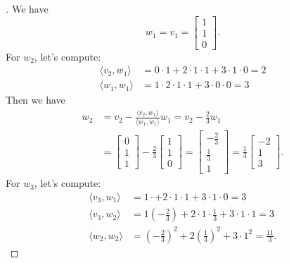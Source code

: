 \documentclass[11pt]{article}
\begin{document}
\begin{enumerate}
        \begin{proof}[\unskip\nopunct]
            We have \[w_1 = v_1 = \begin{bmatrix}
                1 \\ 1 \\ 0
            \end{bmatrix}.\] For \(w_2\), let's compute:
            \begin{align*}
                \langle v_2, w_1 \rangle &= 0 \cdot 1 + 2 \cdot 1 \cdot 1 + 3 \cdot 1 \cdot 0 = 2 \\
                \langle w_1, w_1 \rangle &= 1 \cdot 2 \cdot 1 \cdot 1 + 3 \cdot 0 \cdot 0 = 3
            \end{align*}
            Then we have
            \begin{align*}
                w_2 &= v_2 - \frac{\langle v_2, w_1 \rangle}{\langle w_1, w_1 \rangle} w_1 = v_2 - \frac{2}{3} w_1 \\
                    &= \begin{bmatrix}
                        0 \\ 1 \\ 1
                    \end{bmatrix} - \frac{2}{3} \begin{bmatrix}
                        1 \\ 1 \\ 0
                    \end{bmatrix} = \begin{bmatrix}
                        - \frac{2}{3} \\ \frac{1}{3} \\ 1
                    \end{bmatrix} = \frac{1}{3} \begin{bmatrix}
                        -2 \\ 1 \\ 3
                    \end{bmatrix}.
            \end{align*}
            For \(w_3\), let's compute:
            \begin{align*}
                \langle v_3, w_1 \rangle &= 1 \cdot + 2 \cdot 1 \cdot 1 + 3 \cdot 1 \cdot 0 = 3 \\
                \langle v_3, w_2 \rangle &= 1 \left(- \frac{2}{3}\right) + 2 \cdot 1 \cdot \frac{1}{3} + 3 \cdot 1 \cdot 1 = 3 \\
                \langle w_2, w_2 \rangle &= \left(- \frac{2}{3}\right)^2 + 2 \left(\frac{1}{3}\right)^2 + 3 \cdot 1^2 = \frac{11}{3}.

\end{align*}
\end{proof}
\end{enumerate}
\end{document}
